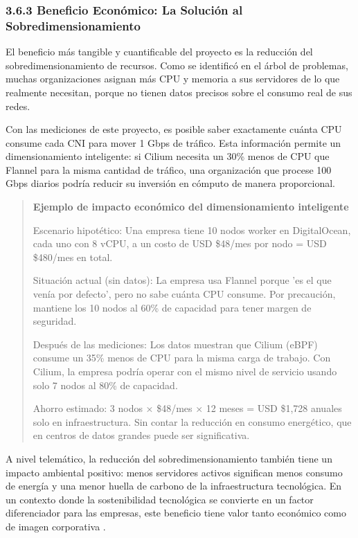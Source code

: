 \documentclass[journal]{IEEEtran}
\begin{document}
\subsubsection{3.6.3 Beneficio Económico: La Solución al Sobredimensionamiento}

El beneficio más tangible y cuantificable del proyecto es la reducción del sobredimensionamiento de recursos. Como se identificó en el árbol de problemas, muchas organizaciones asignan más CPU y memoria a sus servidores de lo que realmente necesitan, porque no tienen datos precisos sobre el consumo real de sus redes.

Con las mediciones de este proyecto, es posible saber exactamente cuánta CPU consume cada CNI para mover 1 Gbps de tráfico. Esta información permite un dimensionamiento inteligente: si Cilium necesita un 30\% menos de CPU que Flannel para la misma cantidad de tráfico, una organización que procese 100 Gbps diarios podría reducir su inversión en cómputo de manera proporcional.

\begin{quote}
\textbf{Ejemplo de impacto económico del dimensionamiento inteligente}

Escenario hipotético: Una empresa tiene 10 nodos worker en DigitalOcean, cada uno con 8 vCPU, a un costo de USD \$48/mes por nodo = USD \$480/mes en total.

Situación actual (sin datos): La empresa usa Flannel porque 'es el que venía por defecto', pero no sabe cuánta CPU consume. Por precaución, mantiene los 10 nodos al 60\% de capacidad para tener margen de seguridad.

Después de las mediciones: Los datos muestran que Cilium (eBPF) consume un 35\% menos de CPU para la misma carga de trabajo. Con Cilium, la empresa podría operar con el mismo nivel de servicio usando solo 7 nodos al 80\% de capacidad.

Ahorro estimado: 3 nodos × \$48/mes × 12 meses = USD \$1,728 anuales solo en infraestructura. Sin contar la reducción en consumo energético, que en centros de datos grandes puede ser significativa.
\end{quote}

A nivel telemático, la reducción del sobredimensionamiento también tiene un impacto ambiental positivo: menos servidores activos significan menos consumo de energía y una menor huella de carbono de la infraestructura tecnológica. En un contexto donde la sostenibilidad tecnológica se convierte en un factor diferenciador para las empresas, este beneficio tiene valor tanto económico como de imagen corporativa \cite{ref8}.
\end{document}
